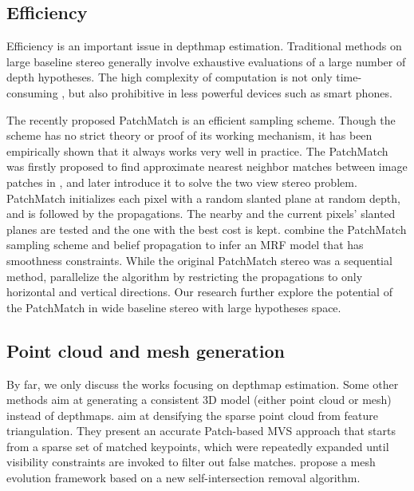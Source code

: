 \subsection{Efficiency}
Efficiency is an important issue in depthmap estimation. Traditional methods on large baseline stereo generally involve exhaustive evaluations of a large number of depth hypotheses. The high complexity of computation is not only time-consuming \cite{yang2003multi,CombinedDepthOutlier,Gallup07,LeastCommitment_3DIMPVT2012}, but also prohibitive in less powerful devices such as smart phones. 

The recently proposed PatchMatch is an efficient sampling scheme. Though the scheme has no strict theory or proof of its working mechanism, it has been empirically shown that it always works very well in practice. The PatchMatch was firstly proposed to find approximate nearest neighbor matches between image patches in \citet{Barnes:2009:PAR}, and later \citet{patchMatchStereo1} introduce it to solve the two view stereo problem. PatchMatch initializes each pixel with a random slanted plane at random depth, and is followed by the propagations. The nearby and the current pixels' slanted planes are tested and the one with the best cost is kept. \citet{patchMatchStereo2} combine the PatchMatch sampling scheme and belief propagation to infer an MRF model that has smoothness constraints.
While the original PatchMatch stereo was a sequential method, \citet{patchMatchParallel} parallelize the algorithm by restricting the propagations to only horizontal and vertical directions. Our research further explore the potential of the PatchMatch in wide baseline stereo with large hypotheses space.

\subsection{Point cloud and mesh generation}
By far, we only discuss the works focusing on depthmap estimation. Some other methods aim at generating a consistent 3D model (either point cloud or mesh) instead of depthmaps. 
\citet{FURUKAWA_PAMI2010} aim at densifying the sparse point cloud from feature triangulation.
They present an accurate Patch-based MVS approach that starts from a sparse set of matched keypoints, which were repeatedly expanded until visibility constraints are invoked to filter out false matches. 
\citet{Zaharescu_PAMI2011} propose a mesh evolution framework based on a new self-intersection removal algorithm. 

